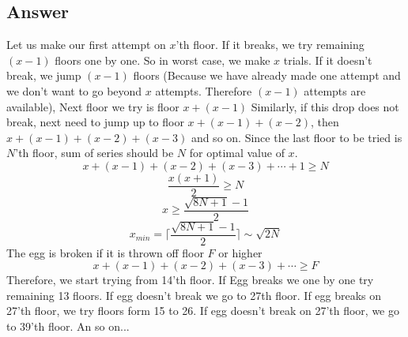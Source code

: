 \documentclass[12pt]{article}
\numberwithin{equation}{section}
\begin{document}
\subsection*{Answer}
Let us make our first attempt on $x$'th floor.
If it breaks, we try remaining $(x-1)$ floors one by one. 
So in worst case, we make $x$ trials.
If it doesn’t break, we jump $(x-1)$ floors (Because we have
already made one attempt and we don't want to go beyond 
$x$ attempts.  Therefore $(x-1)$ attempts are available),
Next floor we try is floor $x + (x-1)$
Similarly, if this drop does not break, next need to jump 
up to floor $x + (x-1) + (x-2)$, then $x + (x-1) + (x-2) + (x-3)$
and so on.
Since the last floor to be tried is $N$'th floor, sum of
series should be $N$ for optimal value of $x$.
\[x + (x-1) + (x-2) + (x-3) + \cdots + 1 \geqslant N\]
\[\frac{x(x+1)}{2} \geqslant N\]
\[x \geqslant \frac{\sqrt{8N+1}-1}{2}\]
\[x_{min} = \lceil \frac{\sqrt{8N+1}-1}{2} \rceil \sim \sqrt{2N}\] 
The egg is broken if it is thrown off floor $F$ or higher
\[x + (x-1) + (x-2) + (x-3) + \cdots \geqslant F\]
Therefore, we start trying from 14'th floor. If Egg breaks
we one by one try remaining 13 floors.  If egg doesn't break
we go to 27th floor.
If egg breaks on 27'th floor, we try floors form 15 to 26.
If egg doesn't break on 27'th floor, we go to 39'th floor.
An so on...
\end{document}
